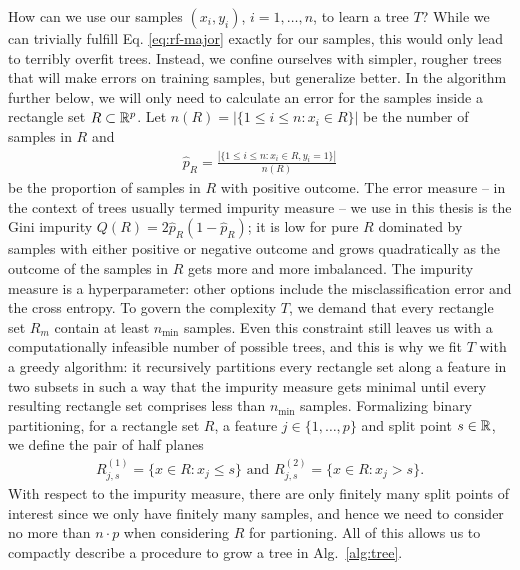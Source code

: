How can we use our samples $(x_i, y_i)$, $i = 1, \ldots, n$, to learn a tree $T$? While we can 
trivially fulfill Eq. \eqref{eq:rf-major} exactly for our samples, this would only lead to terribly 
overfit trees. Instead, we confine ourselves with simpler, rougher trees that will make errors on 
training samples, but generalize better. 
In the algorithm further below, we will only need to calculate an error for the samples inside a 
rectangle set $R \subset \mathbb{R}^p$. Let $n(R) = |\{ 1 \leq i \leq n: x_i \in R \}|$ be the number of 
samples in $R$ and
\begin{align}
    \hat{p}_R = \frac{|\{ 1 \leq i \leq n: x_i \in R, y_i = 1 \}|}{n(R)}
\end{align}
be the proportion of samples in $R$ with positive outcome. The error measure -- in the context of 
trees usually termed impurity measure -- we use in this thesis
is the Gini impurity $Q(R) = 2 \hat{p}_R (1 - \hat{p}_R)$; it is low for pure $R$ dominated by 
samples with either positive or negative outcome and grows quadratically as the outcome of the 
samples in $R$ gets more and more imbalanced. The impurity measure is a hyperparameter: other 
options include the misclassification error and the cross entropy. To govern the complexity $T$,
we demand that every rectangle set $R_m$ contain at least $n_\text{min}$ samples. Even this 
constraint still leaves us with a computationally infeasible number of possible trees, and this is 
why we fit $T$ with a greedy algorithm: it recursively partitions every rectangle set along a 
feature in two subsets in such a way that the impurity measure gets minimal until every resulting 
rectangle set comprises less than $n_\text{min}$ samples. Formalizing binary partitioning, for a 
rectangle set $R$, a feature $j \in \{1, \ldots, p\}$ and split point $s \in \mathbb{R}$, we define 
the pair of half planes
\begin{align}
    R^{(1)}_{j, s} = \{x \in R: x_j \leq s\} \text{ and } R^{(2)}_{j, s} = \{x \in R: x_j > s\}.
\end{align}
With respect to the impurity measure, there are only finitely many split points of interest since 
we only have finitely many samples, and hence we need to consider no more than $n \cdot p$ when 
considering $R$ for partioning. All of this allows us to compactly describe a procedure to grow a 
tree in Alg.\ \ref{alg:tree}.


